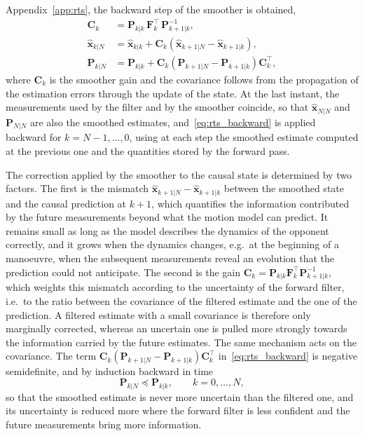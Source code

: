 Appendix~\ref{app:rts}, the backward step of the smoother is obtained,
\begin{equation}
    \begin{aligned}
        \mathbf{C}_k &= \mathbf{P}_{k|k}\,\mathbf{F}_k^\top\,\mathbf{P}_{k+1|k}^{-1}, \\
        \hat{\mathbf{x}}_{k|N} &= \hat{\mathbf{x}}_{k|k}
        + \mathbf{C}_k\left(\hat{\mathbf{x}}_{k+1|N} - \hat{\mathbf{x}}_{k+1|k}\right), \\
        \mathbf{P}_{k|N} &= \mathbf{P}_{k|k}
        + \mathbf{C}_k\left(\mathbf{P}_{k+1|N} - \mathbf{P}_{k+1|k}\right)\mathbf{C}_k^\top,
    \end{aligned}
    \label{eq:rts_backward}
\end{equation}
where $\mathbf{C}_k$ is the smoother gain and the covariance follows from the propagation of
the estimation errors through the update of the state. At the last instant, the measurements
used by the filter and by the smoother coincide, so that $\hat{\mathbf{x}}_{N|N}$ and
$\mathbf{P}_{N|N}$ are also the smoothed estimates, and~\eqref{eq:rts_backward} is applied
backward for $k = N-1, \dots, 0$, using at each step the smoothed estimate computed at the
previous one and the quantities stored by the forward pass.

The correction applied by the smoother to the causal state is determined by two factors.
The first is the mismatch $\hat{\mathbf{x}}_{k+1|N} - \hat{\mathbf{x}}_{k+1|k}$ between the
smoothed state and the causal prediction at $k+1$, which quantifies the information
contributed by the future measurements beyond what the motion model can predict. It remains
small as long as the model describes the dynamics of the opponent correctly, and it grows when
the dynamics changes, e.g.\ at the beginning of a manoeuvre, when the subsequent measurements
reveal an evolution that the prediction could not anticipate. The second is the gain
$\mathbf{C}_k = \mathbf{P}_{k|k}\mathbf{F}_k^\top\mathbf{P}_{k+1|k}^{-1}$, which weights this
mismatch according to the uncertainty of the forward filter, i.e.\ to the ratio between the
covariance of the filtered estimate and the one of the prediction. A filtered estimate with a
small covariance is therefore only marginally corrected, whereas an uncertain one is pulled
more strongly towards the information carried by the future estimates. The same
mechanism acts on the covariance.  The term
$\mathbf{C}_k(\mathbf{P}_{k+1|N} - \mathbf{P}_{k+1|k})\mathbf{C}_k^\top$
in~\eqref{eq:rts_backward} is negative semidefinite, and by induction backward in time
\begin{equation}
    \mathbf{P}_{k|N} \preceq \mathbf{P}_{k|k}, \qquad k = 0, \dots, N,
    \label{eq:rts_cov_bound}
\end{equation}
so that the smoothed estimate is never more uncertain than the filtered one, and its
uncertainty is reduced more where the forward filter is less confident and the future
measurements bring more information.

